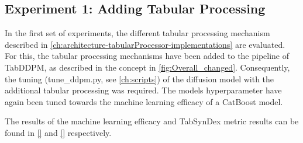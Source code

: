 \subsection[]{Experiment 1: Adding Tabular Processing}
\label{ch:Experiment-1}

In the first set of experiments, the different tabular processing mechanism described in \autoref{ch:architecture-tabularProcessor-implementations} are evaluated.
For this, the tabular processing mechanisms have been added to the pipeline of TabDDPM, as described in the concept in \autoref{fig:Overall_changed}.
Consequently, the tuning (tune\_ddpm.py, see \autoref{ch:scripts}) of the diffusion model with the additional tabular processing was required.
The models hyperparameter have again been tuned towards the machine learning efficacy of a CatBoost model.

The results of the machine learning efficacy and TabSynDex metric results can be found in \autoref{} and \autoref{} respectively.




